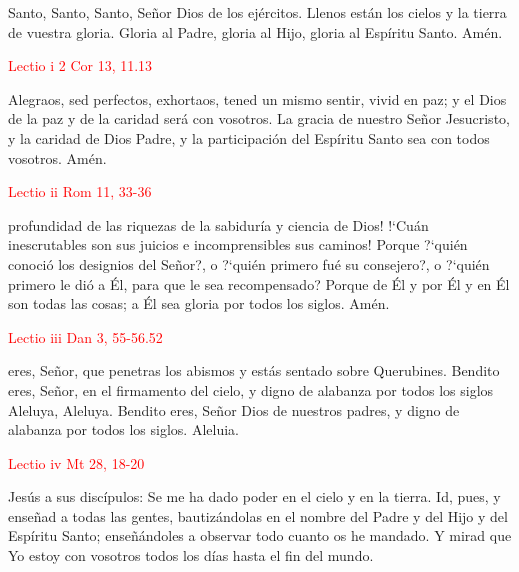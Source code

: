 Santo, Santo, Santo, Señor Dios de los ejércitos. Llenos están los cielos y la tierra de vuestra gloria. Gloria al Padre, gloria al Hijo, gloria al Espíritu Santo. Amén.

\vspace{0.5em}

\noindent\textcolor{red}{Lectio i \hfill 2 Cor 13, 11.13}

Alegraos, sed perfectos, exhortaos, tened un mismo sentir, vivid en paz; y el Dios de la paz y de la caridad será con vosotros. La gracia de nuestro Señor Jesucristo,
y la caridad de Dios Padre, y la participación del Espíritu Santo sea con todos vosotros. Amén.

\vspace{0.5em}

\noindent\textcolor{red}{Lectio ii \hfill Rom 11, 33-36}

profundidad de las riquezas de la sabiduría y ciencia de Dios! {!`}Cuán inescrutables son sus juicios e incomprensibles sus caminos! Porque {?`}quién conoció los designios del Señor?,
o {?`}quién primero fué su consejero?, o {?`}quién primero le dió a Él, para que le sea recompensado? Porque de Él y por Él y en Él son todas las cosas; a Él sea gloria por todos los siglos.
Amén.

\vspace{0.5em}

\noindent\textcolor{red}{Lectio iii \hfill Dan 3, 55-56.52}

eres, Señor, que penetras los abismos y estás sentado sobre Querubines. Bendito eres, Señor, en el firmamento del cielo, y digno de alabanza por todos los siglos
Aleluya, Aleluya. Bendito eres, Señor Dios de nuestros padres, y digno de alabanza por todos los siglos. Aleluia.

\vspace{0.5em}

\noindent\textcolor{red}{Lectio iv \hfill Mt 28, 18-20}

Jesús a sus discípulos: Se me ha dado poder en el cielo y en la tierra. Id, pues, y enseñad a todas las gentes, bautizándolas en el nombre del Padre y del Hijo y del Espíritu
Santo; enseñándoles a observar todo cuanto os he mandado. Y mirad que Yo estoy con vosotros todos los días hasta el fin del mundo.

\vspace{0.5em}

